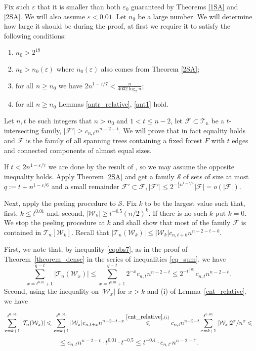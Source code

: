 \documentclass[11pt,letterpaper]{amsart}
\newcommand{\eps}{\varepsilon}
\renewcommand{\le}{\leqslant}
\renewcommand{\ge}{\geqslant}
\newcommand{\ff}{\mathcal{F}}
\newcommand{\s}{\mathcal{S}}
\newcommand{\T}{\mathcal{T}}
\newcommand{\W}{\mathcal{W}}
\begin{document}
Fix such $\eps$ that it is smaller than both $\eps_0$ guaranteed by Theorems \ref{1SA} and \ref {2SA}. We will also assume $\eps < 0.01$. Let $n_0$ be a large number. We will determine how large it should be during the proof, at first we require it to satisfy the following conditions:
\begin{enumerate}
    \item $n_0 > 2^{19}$
    \item $n_0> n_0(\eps)$ where $n_0(\eps)$ also comes from Theorem \ref {2SA};
    \item for all $n \ge n_0$ we have $2n^{1 - \eps/7} < \frac n{4032\log_2n}$;
    \item for all $n \ge n_0$ Lemmas \ref{antr_relative}, \ref {ant1} hold.
\end{enumerate} Let $n, t$ be such integers that $n > n_0$ and $1 < t \le n-2$, let $\ff \subset \T_n$ be a $t$-intersecting family, $|\ff'| \ge c_{n, t}n^{n - 2 - t}$. We will prove that in fact equality holds and $\ff$ is the family of all spanning trees containing a fixed forest $F$ with $t$ edges and connected components of almost equal sizes.

If $t < 2n^{1-\eps/7}$ we are done by the result of \cite{EKR_trees}, so we may assume the opposite inequality holds. Apply Theorem \ref{2SA} and get a family $\s$ of sets of size at most $q:=t+n^{1-\eps/6}$ and a small remainder $\ff' \subset \ff, |\ff'| \le 2^{-\frac 12 n^{1-\epsilon/4}}|\ff| = o(|\ff|)$.

Next, apply the peeling procedure to $\s$. Fix $k$ to be the largest value such that, first, $k\le t^{0.01}$ and, second, $|\W_k|\ge t^{-0.5}(n/2)^k$. If there is no such $k$ put $k=0$. We stop the peeling procedure at $k$ and shall show that most of the family $\ff$ is contained in $\T_n[\W_k]$. Recall that $|\T_n(\W_k)|\le |\W_k|c_{n, t+k}n^{n-2-t-k}$.

First, we note that, by inequality \eqref{eqobs7}, as in the proof of Theorem~\ref{theorem_dense} in the series of inequalities \eqref{eq_sum}, we have \begin{equation}\label{eqres1}
\sum_{x = t^{0.01}+1}^{q-t}|\T_n(\W_x)|\le \sum_{x = t^{0.01}+1}^{q-t}2^{-x}c_{n, t}n^{n-2-t}\le 2^{-t^{0.01}}c_{n, t}n^{n-2-t}.                                        \end{equation}
Second, using the inequality on $|\W_x|$ for $x>k$ and (i) of Lemma~\ref{cnt_relative}, we have

\begin{equation}\label{eqres2}
\sum_{x = k+1}^{t^{0.01}}|\T_n(\W_x)|\le \sum_{x = k+1}^{t^{0.01}}|\W_x|c_{n, t+x}n^{n-2-t-x} \overset{\ref{cnt_relative}, (i)}{\le} c_{n, t}n^{n-2-t}\sum_{x = k+1}^{t^{0.01}}|\W_x|2^x/n^x \le  \end{equation}
$$\le c_{n, t}n^{n-2-t} \cdot t^{0.01} \cdot t^{-0.5} \le t^{-0.4}\cdot c_{n, t'}n^{n-2-t'}.$$
\end{document}
